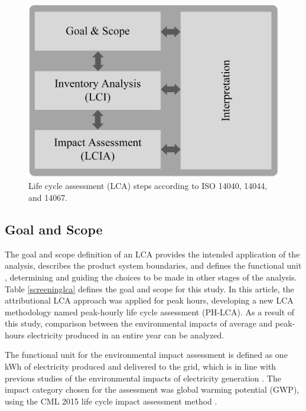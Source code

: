 \begin{figure}[]
	\centering
	\includegraphics[width=0.4\columnwidth ]{ChapterLCA/Images/LCA_Framework_v3.jpg}
		\caption{Life cycle assessment (LCA) steps according to ISO 14040, 14044, and 14067.}
	\label{LCA_Methodology}  %
\end{figure}


{\subsection {Goal and Scope} \label{goalscope}}
{The goal and scope definition of an LCA provides the intended application of the analysis, describes the product system boundaries, and defines the functional unit \cite{REBITZER2004701}, determining and guiding the choices to be made in other stages of the analysis. Table \ref{screeninglca} defines the goal and scope for this study.} {In this article, the attributional LCA approach was applied for peak hours, developing a new LCA methodology named peak-hourly life cycle assessment (PH-LCA). As a result of this study, comparison between the environmental impacts of average and peak-hours  electricity produced in an entire year can be analyzed.} 

{The functional unit for the environmental impact assessment is defined as one kWh of electricity produced and delivered to the grid, which is in line with previous studies of the environmental impacts of electricity generation \cite{Nilsson2017AssessingEmissions, Khan2018, Khan2018AnalysisIntensity, MESSAGIE2014469, Cubi2015IncorporationAssessment, Buyle2019}. The impact category chosen for the assessment was global warming potential (GWP), using the CML 2015 life cycle impact assessment method \cite{Guinee2001}.} 


